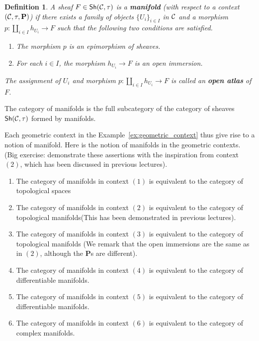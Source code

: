 \documentclass{tufte-book} %
\numberwithin{dummy}{section}
\newtheorem{dfn}[thm]{Definition}
\newcommand{\calc}{{\cal C}}
\newcommand{\lrta}{\longrightarrow}
\newcommand{\ssh}{\mathsf{Sh}}
\newcommand{\bfp}{\mathbf{P}}
\begin{document}
\begin{dfn}
A sheaf $F\in \ssh(\calc,\tau)$ is a \textbf{manifold} (with respect to a context $(\calc,\tau,\bfp)$) if there exists a family of objects $\{U_i\}_{i\in I}$ in $\calc$ and a morphism $p:\coprod_{i\in I}h_{U_i}\lrta F$ such that the following two conditions are satisfied.
\begin{enumerate}
\item The morphism $p$ is an epimorphism of sheaves.
\item For each $i\in I$, the morphism $h_{U_i}\lrta F$ is an open immersion.
\end{enumerate}
The assignment of $U_i$ and morphism $p:\coprod_{i\in I} h_{U_i}\lrta F$ is called an \textbf{open atlas} of $F$.
\end{dfn}
The category of manifolds is the full subcategory of the category of sheaves $\ssh(\calc,\tau)$ formed by manifolds.

Each geometric context in the Example~\ref{ex:geometric_context} thus give rise to a notion of manifold. Here is the notion of manifolds in the geometric contexts. (Big exercise: demonstrate these assertions with the inspiration from context $(2)$, which has been discussed in previous lectures).
\begin{enumerate}
\item The category of manifolds in context $(1)$ is equivalent to the category of topological spaces
\item The category of manifolds in context $(2)$ is equivalent to the category of topological manifolds(This has been demonstrated in previous lectures).
\item The category of manifolds in context $(3)$ is equivalent to the category of topological manifolds
(We remark that the open immersions are the same as in $(2)$, although the $\bfp$s are different).
\item The category of manifolds in context $(4)$ is equivalent to the category of differentiable manifolds.
\item The category of manifolds in context $(5)$ is equivalent to the category of differentiable manifolds.
\item The category of manifolds in context $(6)$ is equivalent to the category of complex manifolds.
\end{enumerate}
\end{document}
